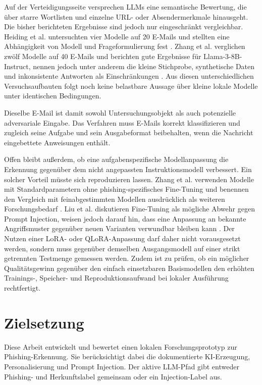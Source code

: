 \documentclass[12pt,twoside=false,a4paper,parskip]{scrbook}
\begin{document}
Auf der Verteidigungsseite versprechen LLMs eine semantische Bewertung, die über starre Wortlisten und einzelne URL- oder Absendermerkmale hinausgeht. Die bisher berichteten Ergebnisse sind jedoch nur eingeschränkt vergleichbar. Heiding et al. untersuchten vier Modelle auf 20 E-Mails und stellten eine Abhängigkeit von Modell und Frageformulierung fest \cite{heiding2024devising}. Zhang et al. verglichen zwölf Modelle auf 40 E-Mails und berichten gute Ergebnisse für Llama-3-8B-Instruct, nennen jedoch unter anderem die kleine Stichprobe, synthetische Daten und inkonsistente Antworten als Einschränkungen \cite{zhang2025benchmarking}. Aus diesen unterschiedlichen Versuchsaufbauten folgt noch keine belastbare Aussage über kleine lokale Modelle unter identischen Bedingungen.

Dieselbe E-Mail ist damit sowohl Untersuchungsobjekt als auch potenzielle adversariale Eingabe. Das Verfahren muss E-Mails korrekt klassifizieren und zugleich seine Aufgabe und sein Ausgabeformat beibehalten, wenn die Nachricht eingebettete Anweisungen enthält.

Offen bleibt außerdem, ob eine aufgabenspezifische Modellanpassung die Erkennung gegenüber dem nicht angepassten Instruktionsmodell verbessert. Ein solcher Vorteil müsste sich reproduzieren lassen. Zhang et al. verwenden Modelle mit Standardparametern ohne phishing-spezifisches Fine-Tuning und benennen den Vergleich mit feinabgestimmten Modellen ausdrücklich als weiteren Forschungsbedarf \cite{zhang2025benchmarking}. Liu et al. diskutieren Fine-Tuning als mögliche Abwehr gegen Prompt Injection, weisen jedoch darauf hin, dass eine Anpassung an bekannte Angriffsmuster gegenüber neuen Varianten verwundbar bleiben kann \cite{liu2024formalizing}. Der Nutzen einer LoRA- oder QLoRA-Anpassung darf daher nicht vorausgesetzt werden, sondern muss gegenüber demselben Ausgangsmodell auf einer strikt getrennten Testmenge gemessen werden. Zudem ist zu prüfen, ob ein möglicher Qualitätsgewinn gegenüber den einfach einsetzbaren Basismodellen den erhöhten Trainings-, Speicher- und Reproduktionsaufwand bei lokaler Ausführung rechtfertigt.

\section{Zielsetzung}\label{sec:zielsetzung}

Diese Arbeit entwickelt und bewertet einen lokalen Forschungsprototyp zur Phishing-Erkennung. Sie berücksichtigt dabei die dokumentierte KI-Erzeugung, Personalisierung und Prompt Injection. Der aktive LLM-Pfad gibt entweder Phishing- und Herkunftslabel gemeinsam oder ein Injection-Label aus.
\end{document}
